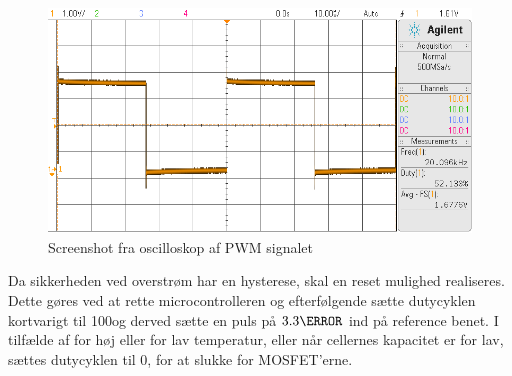 \begin{figure}[h]
	\centering
	\includegraphics[width=15cm]{billeder/pwm_scope.png}
	\caption{Screenshot fra oscilloskop af PWM signalet}
	\label{fig:pwm_scope}
\end{figure}

Da sikkerheden ved overstrøm har en hysterese, skal en reset mulighed realiseres. Dette gøres ved at rette microcontrolleren og efterfølgende sætte dutycyklen kortvarigt til 100\percent\space og derved sætte en puls på $3.3\volt$ ind på reference benet. I tilfælde af for høj eller for lav temperatur, eller når cellernes kapacitet er for lav, sættes dutycyklen til 0\percent, for at slukke for MOSFET'erne.

